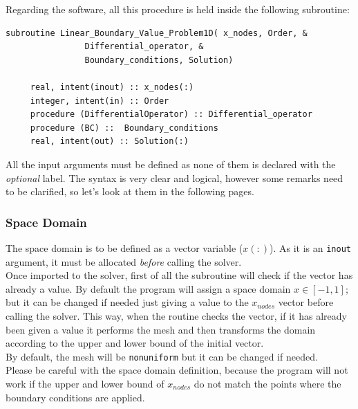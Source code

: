 Regarding the software, all this procedure is held inside the following
subroutine: \\

\begin{blueframed}
\begin{lstlisting}
subroutine Linear_Boundary_Value_Problem1D( x_nodes, Order, &
 				Differential_operator, &
 				Boundary_conditions, Solution)
        
     real, intent(inout) :: x_nodes(:)
     integer, intent(in) :: Order
     procedure (DifferentialOperator) :: Differential_operator
     procedure (BC) ::  Boundary_conditions
     real, intent(out) :: Solution(:) 

\end{lstlisting}

\end{blueframed}


All the input arguments must be defined as none of them is declared with the
\textit{optional} label. The syntax is very clear and logical, however some remarks need to
be clarified, so let's look at them in the following pages. \\

\newpage

\subsubsection{Space Domain}

The space domain is to be defined as a vector variable ($x(:)$). As it is an
\texttt{inout} argument, it must be allocated \textit{before} calling the
solver. \\

Once imported to the solver, first of all the subroutine will check if the
vector has already a value. By default the program will assign a space domain
$x \in [-1,1]$; but it can be changed if needed just giving a value to the
$x_{nodes}$ vector before calling the solver. This way, when the routine checks
the vector, if it has already been given a value it performs the mesh and then
transforms the domain according to the upper and lower bound of the initial
vector. \\

By default, the mesh will be \texttt{nonuniform} but it can be changed if
needed. \\

Please be careful with the space domain definition, because the program will not
work if the upper and lower bound of $x_{nodes}$ do not match the points
where the boundary conditions are applied. \\

